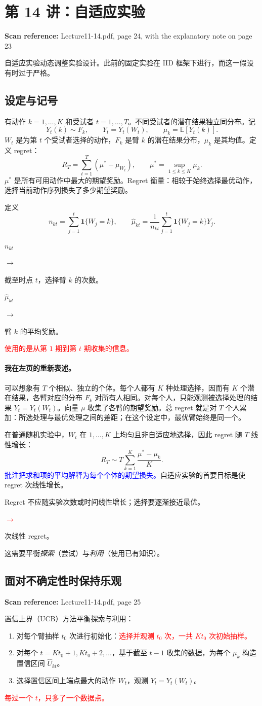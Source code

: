 \documentclass[11pt,a4paper]{article}
\newcommand{\sourcepages}[1]{\par{\small\sffamily\color{muted}\textbf{Scan reference:} #1\par}\nobreak\smallskip\nopagebreak[4]}
\newcommand{\inkblue}[1]{\textcolor{blue}{#1}}
\newcommand{\inkred}[1]{\textcolor{red}{#1}}
\newcommand{\notearrow}[3]{%
\par\Needspace{6\baselineskip}\smallskip
\noindent\begin{minipage}[c]{0.43\linewidth}\raggedright\color{#1}#2\end{minipage}%
\hfill\textcolor{#1}{\(\longrightarrow\)}\hfill%
\begin{minipage}[c]{0.43\linewidth}\raggedright#3\end{minipage}\par\smallskip}
\begin{document}
\section{第 14 讲：自适应实验}
\sourcepages{Lecture11-14.pdf, page 24, with the explanatory note on page 23}
自适应实验动态调整实验设计。此前的固定实验在 IID 框架下进行，而这一假设有时过于严格。

\subsection{设定与记号}
有动作 $k=1,\ldots,K$ 和受试者 $t=1,\ldots,T$。不同受试者的潜在结果独立同分布。记
\[
 Y_t(k)\sim F_k,\qquad Y_t=Y_t(W_t),\qquad
 \mu_k=\mathbb E[Y_t(k)].
\]
$W_t$ 是为第 $t$ 个受试者选择的动作，$F_k$ 是臂 $k$ 的潜在结果分布，$\mu_k$ 是其均值。定义 regret：
\[
 R_T=\sum_{t=1}^T(\mu^*-\mu_{W_t}),\qquad
 \mu^*=\sup_{1\le k\le K}\mu_k.
\]
$\mu^*$ 是所有可用动作中最大的期望奖励。Regret 衡量：相较于始终选择最优动作，选择当前动作序列损失了多少期望奖励。

定义
\[
 n_{kt}=\sum_{j=1}^t\mathbf1\{W_j=k\},\qquad
 \widehat\mu_{kt}=\frac1{n_{kt}}\sum_{j=1}^t\mathbf1\{W_j=k\}Y_j.
\]
\notearrow{black}{$n_{kt}$}{截至时点 $t$，选择臂 $k$ 的次数。}
\notearrow{black}{$\widehat\mu_{kt}$}{臂 $k$ 的平均奖励。}
\inkred{使用的是从第 $1$ 期到第 $t$ 期收集的信息。}

\paragraph{我在左页的重新表述。}
可以想象有 $T$ 个相似、独立的个体。每个人都有 $K$ 种处理选择，因而有 $K$ 个潜在结果，各臂对应的分布 $F_k$ 对所有人相同。对每个人，只能观测被选择处理的结果 $Y_t=Y_t(W_t)$。向量 $\mu$ 收集了各臂的期望奖励。总 regret 就是对 $T$ 个人累加：所选处理与最优处理之间的差距；在这个设定中，最优臂始终是同一个。

在普通随机实验中，$W_t$ 在 $1,\ldots,K$ 上均匀且非自适应地选择，因此 regret 随 $T$ 线性增长：
\[
 R_T\sim T\sum_{k=1}^K\frac{\mu^*-\mu_k}{K}.
\]
\inkblue{批注把求和项的平均解释为每个个体的期望损失。}自适应实验的首要目标是使 regret 次线性增长。\notearrow{red}{Regret 不应随实验次数或时间线性增长；选择要逐渐接近最优。}{次线性 regret。}这需要平衡\emph{探索}（尝试）与\emph{利用}（使用已有知识）。

\subsection{面对不确定性时保持乐观}
\sourcepages{Lecture11-14.pdf, page 25}
置信上界（UCB）方法平衡探索与利用：
\begin{enumerate}
 \item 对每个臂抽样 $t_0$ 次进行初始化：\inkred{选择并观测 $t_0$ 次，一共 $Kt_0$ 次初始抽样。}
 \item 对每个 $t=Kt_0+1,Kt_0+2,\ldots$，基于截至 $t-1$ 收集的数据，为每个 $\mu_k$ 构造置信区间 $\widehat U_{kt}$。
 \item 选择置信区间上端点最大的动作 $W_t$，观测 $Y_t=Y_t(W_t)$。
\end{enumerate}
\inkred{每过一个 $t$，只多了一个数据点。}
\end{document}
